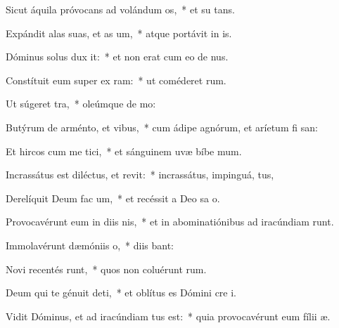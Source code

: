 \item Sicut áquila próvocans ad volándum  os,~* et su  tans.
\item Expándit alas suas, et as um,~* atque portávit in  is.
\item Dóminus solus dux  it:~* et non erat cum eo de nus.
\item Constítuit eum super ex ram:~* ut coméderet  rum.
\item Ut súgeret   tra,~* oleúmque de  mo:
\item Butýrum de arménto, et   vibus,~* cum ádipe agnórum, et aríetum fi san:
\item Et hircos cum me tici,~* et sánguinem uvæ bíbe mum.
\item Incrassátus est diléctus, et revit:~* incrassátus, impinguá, tus,
\item Derelíquit Deum fac um,~* et recéssit a Deo sa o.
\item Provocavérunt eum in diis nis,~* et in abominatiónibus ad iracúndiam runt.
\item Immolavérunt dæmóniis   o,~* diis  bant:
\item Novi recentés runt,~* quos non coluérunt  rum.
\item Deum qui te génuit deti,~* et oblítus es Dómini cre i.
\item \singlecolsep
\item Vidit Dóminus, et ad iracúndiam tus est:~* quia provocavérunt eum fílii   æ.
